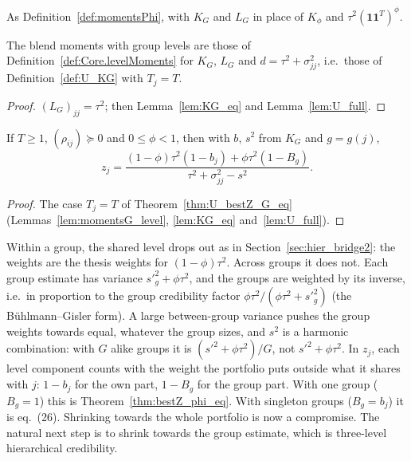 \begin{definition}\label{def:momentsG}
  \leanok
  As Definition~\ref{def:momentsPhi}, with $K_G$ and $L_G$ in place of
  $K_\phi$ and $\tau^2(\mathbf 1\mathbf 1^T)^\phi$.
\end{definition}

\begin{lemma}\label{lem:momentsG_level}
  \leanok
  The blend moments with group levels are those of
  Definition~\ref{def:Core.levelMoments} for $K_G$, $L_G$ and
  $d = \tau^2 + \sigma^2_{jj}$, i.e.\ those of Definition~\ref{def:U_KG} with $T_j = T$.
\end{lemma}
\begin{proof}
  \leanok
  $(L_G)_{jj} = \tau^2$; then Lemma~\ref{lem:KG_eq} and Lemma~\ref{lem:U_full}.
\end{proof}

\begin{theorem}\label{thm:bestZ_G_eq}
  \leanok
  If $T \ge 1$, $(\rho_{ij}) \succeq 0$ and $0 \le \phi < 1$, then with $b$, $s^2$
  from $K_G$ and $g = g(j)$,
  \[
    z_j = \frac{(1-\phi)\tau^2(1 - b_j) + \phi\tau^2(1 - B_g)}{\tau^2 + \sigma^2_{jj} - s^2}.
  \]
\end{theorem}
\begin{proof}
  \leanok
  The case $T_j = T$ of Theorem~\ref{thm:U_bestZ_G_eq} (Lemmas~\ref{lem:momentsG_level},
  \ref{lem:KG_eq} and~\ref{lem:U_full}).
\end{proof}

\begin{remark}\label{rem:hier_bridge4}
  Within a group, the shared level drops out as in
  Section~\ref{sec:hier_bridge2}: the weights are the thesis weights for
  $(1-\phi)\tau^2$. Across groups it does not. Each group estimate has
  variance $s'^2_g + \phi\tau^2$, and the groups are weighted by its inverse,
  i.e.\ in proportion to the group credibility factor
  $\phi\tau^2/(\phi\tau^2 + s'^2_g)$ (the Bühlmann--Gisler form). A large
  between-group variance pushes the group weights towards equal, whatever the
  group sizes, and $s^2$ is a harmonic combination: with $G$ alike groups it
  is $(s'^2 + \phi\tau^2)/G$, not $s'^2 + \phi\tau^2$. In $z_j$, each level
  component counts with the weight the portfolio puts outside what it shares
  with $j$: $1 - b_j$ for the own part, $1 - B_g$ for the group part. With one
  group ($B_g = 1$) this is Theorem~\ref{thm:bestZ_phi_eq}. With singleton
  groups ($B_g = b_j$) it is eq.\ (26). Shrinking towards the whole portfolio
  is now a compromise. The natural next step is to shrink towards the group
  estimate, which is three-level hierarchical credibility.
\end{remark}

